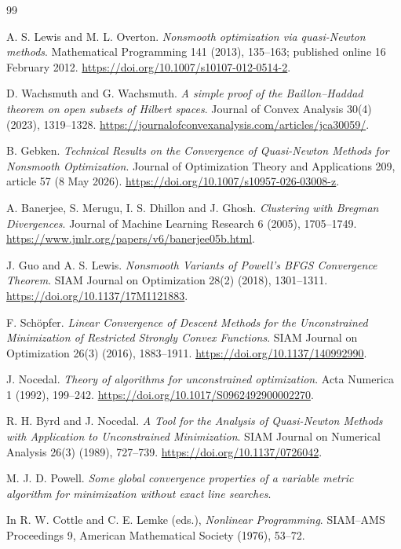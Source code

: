 \begin{thebibliography}{99}

 A. S. Lewis and M. L. Overton. \emph{Nonsmooth optimization via quasi-Newton methods}. Mathematical Programming 141 (2013), 135--163; published online 16 February 2012. \url{https://doi.org/10.1007/s10107-012-0514-2}.

 D. Wachsmuth and G. Wachsmuth. \emph{A simple proof of the Baillon--Haddad theorem on open subsets of Hilbert spaces}. Journal of Convex Analysis 30(4) (2023), 1319--1328. \url{https://journalofconvexanalysis.com/articles/jca30059/}.

 B. Gebken. \emph{Technical Results on the Convergence of Quasi-Newton Methods for Nonsmooth Optimization}. Journal of Optimization Theory and Applications 209, article 57 (8 May 2026). \url{https://doi.org/10.1007/s10957-026-03008-z}.

 A. Banerjee, S. Merugu, I. S. Dhillon and J. Ghosh. \emph{Clustering with Bregman Divergences}. Journal of Machine Learning Research 6 (2005), 1705--1749. \url{https://www.jmlr.org/papers/v6/banerjee05b.html}.

 J. Guo and A. S. Lewis. \emph{Nonsmooth Variants of Powell's BFGS Convergence Theorem}. SIAM Journal on Optimization 28(2) (2018), 1301--1311. \url{https://doi.org/10.1137/17M1121883}.

 F. Sch\"opfer. \emph{Linear Convergence of Descent Methods for the Unconstrained Minimization of Restricted Strongly Convex Functions}. SIAM Journal on Optimization 26(3) (2016), 1883--1911. \url{https://doi.org/10.1137/140992990}.

 J. Nocedal. \emph{Theory of algorithms for unconstrained optimization}. Acta Numerica 1 (1992), 199--242. \url{https://doi.org/10.1017/S0962492900002270}.

 R. H. Byrd and J. Nocedal. \emph{A Tool for the Analysis of Quasi-Newton Methods with Application to Unconstrained Minimization}. SIAM Journal on Numerical Analysis 26(3) (1989), 727--739. \url{https://doi.org/10.1137/0726042}.

 M. J. D. Powell. \emph{Some global convergence properties of a variable metric algorithm for minimization without exact line searches}.\par
In R. W. Cottle and C. E. Lemke (eds.), \emph{Nonlinear Programming}. SIAM--AMS Proceedings 9, American Mathematical Society (1976), 53--72.


\end{thebibliography}
